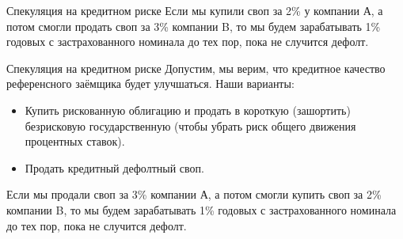 \documentclass{beamer}
\begin{document}
\newcommand{\paymentFlow}[4] {
	\draw [
		->,
		>=triangle 90
	]
	(#1) -- (#2)
	node[
		pos = 0.5,
		anchor = #4
	]
	{#3};
}

\begin{frame}{Спекуляция на кредитном риске}
\justify
Если мы купили своп за 2\% у компании А, а потом смогли продать своп за 3\% компании B, то мы будем зарабатывать 1\% годовых с застрахованного номинала до тех пор, пока не случится дефолт.

\justify
\centering
{}
\end{frame}



\begin{frame}{Спекуляция на кредитном риске}
\justify
Допустим, мы верим, что кредитное качество референсного заёмщика будет улучшаться. Наши варианты:
\begin{itemize}
\justifying
\item Купить рискованную облигацию и продать в короткую (зашортить) безрисковую государственную (чтобы убрать риск общего движения процентных ставок).
\item Продать кредитный дефолтный своп.
\end{itemize}

\justify
Если мы продали своп за 3\% компании А, а потом смогли купить своп за 2\% компании B, то мы будем зарабатывать 1\% годовых с застрахованного номинала до тех пор, пока не случится дефолт.
\end{frame}
\end{document}
